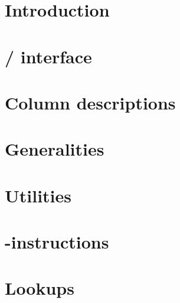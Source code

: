 


\section{Introduction}                      \label{mmu: intro}                  
\section{\hubMod{} / \mmuMod{} interface}   \label{mmu: hub <> mmu interface}   
\section{Column descriptions}               \label{mmu: columns}                
\section{Generalities}                      \label{mmu: generalities}           
\section{Utilities}                         \label{mmu: utilities}              
\section{\mmuMod{}-instructions}            \label{mmu: instructions}           
\section{Lookups}                           \label{mmu: lookups}                
